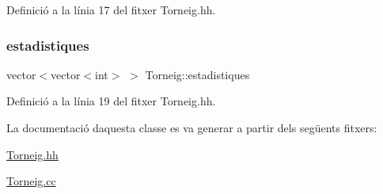 Definició a la línia 17 del fitxer Torneig.\+hh.

\mbox{\label{class_torneig_afb270c579c18c46261a52122fb152942}} 
\subsubsection{\texorpdfstring{estadistiques}{estadistiques}}
{\footnotesize\ttfamily vector$<$vector$<$int$>$ $>$ Torneig\+::estadistiques\hspace{0.3cm}{\ttfamily [private]}}



Definició a la línia 19 del fitxer Torneig.\+hh.



La documentació d\textquotesingle{}aquesta classe es va generar a partir dels següents fitxers\+:\begin{DoxyCompactItemize}
\item 
\mbox{\hyperlink{_torneig_8hh}{Torneig.\+hh}}\item 
\mbox{\hyperlink{_torneig_8cc}{Torneig.\+cc}}\end{DoxyCompactItemize}
